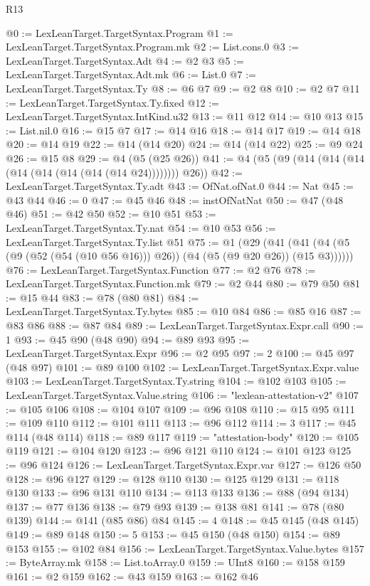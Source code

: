 \begin{lexlean}{R13}
\begin{coremodule}
{{{{{{{{{{{{{{{{{{{{{{{{{{{{{{{{{{{{{{{{{{{{{{{{{{{{{{{{{{{{{{{{{{{{{{{{{{{{{{{{{{{{{{{{{{{{{{{{{{{{{{{{{{@0 := LexLeanTarget.TargetSyntax.Program
@1 := LexLeanTarget.TargetSyntax.Program.mk
@2 := List.cons.{0}
@3 := LexLeanTarget.TargetSyntax.Adt
@4 := @2 @3
@5 := LexLeanTarget.TargetSyntax.Adt.mk
@6 := List.{0}
@7 := LexLeanTarget.TargetSyntax.Ty
@8 := @6 @7
@9 := @2 @8
@10 := @2 @7
@11 := LexLeanTarget.TargetSyntax.Ty.fixed
@12 := LexLeanTarget.TargetSyntax.IntKind.u32
@13 := @11 @12
@14 := @10 @13
@15 := List.nil.{0}
@16 := @15 @7
@17 := @14 @16
@18 := @14 @17
@19 := @14 @18
@20 := @14 @19
@22 := @14 (@14 @20)
@24 := @14 (@14 @22)
@25 := @9 @24
@26 := @15 @8
@29 := @4 (@5 (@25 @26))
@41 := @4 (@5 (@9 (@14 (@14 (@14 (@14 (@14 (@14 (@14 (@14 @24)))))))) @26))
@42 := LexLeanTarget.TargetSyntax.Ty.adt
@43 := OfNat.ofNat.{0}
@44 := Nat
@45 := @43 @44
@46 := 0
@47 := @45 @46
@48 := instOfNatNat
@50 := @47 (@48 @46)
@51 := @42 @50
@52 := @10 @51
@53 := LexLeanTarget.TargetSyntax.Ty.nat
@54 := @10 @53
@56 := LexLeanTarget.TargetSyntax.Ty.list @51
@75 := @1
    (@29 (@41 (@41 (@4 (@5 (@9 (@52 (@54 (@10 @56 @16))) @26)) (@4 (@5 (@9 @20 @26)) (@15 @3))))))
@76 := LexLeanTarget.TargetSyntax.Function
@77 := @2 @76
@78 := LexLeanTarget.TargetSyntax.Function.mk
@79 := @2 @44
@80 := @79 @50
@81 := @15 @44
@83 := @78 (@80 @81)
@84 := LexLeanTarget.TargetSyntax.Ty.bytes
@85 := @10 @84
@86 := @85 @16
@87 := @83 @86
@88 := @87 @84
@89 := LexLeanTarget.TargetSyntax.Expr.call
@90 := 1
@93 := @45 @90 (@48 @90)
@94 := @89 @93
@95 := LexLeanTarget.TargetSyntax.Expr
@96 := @2 @95
@97 := 2
@100 := @45 @97 (@48 @97)
@101 := @89 @100
@102 := LexLeanTarget.TargetSyntax.Expr.value
@103 := LexLeanTarget.TargetSyntax.Ty.string
@104 := @102 @103
@105 := LexLeanTarget.TargetSyntax.Value.string
@106 := "lexlean-attestation-v2"
@107 := @105 @106
@108 := @104 @107
@109 := @96 @108
@110 := @15 @95
@111 := @109 @110
@112 := @101 @111
@113 := @96 @112
@114 := 3
@117 := @45 @114 (@48 @114)
@118 := @89 @117
@119 := "attestation-body"
@120 := @105 @119
@121 := @104 @120
@123 := @96 @121 @110
@124 := @101 @123
@125 := @96 @124
@126 := LexLeanTarget.TargetSyntax.Expr.var
@127 := @126 @50
@128 := @96 @127
@129 := @128 @110
@130 := @125 @129
@131 := @118 @130
@133 := @96 @131 @110
@134 := @113 @133
@136 := @88 (@94 @134)
@137 := @77 @136
@138 := @79 @93
@139 := @138 @81
@141 := @78 (@80 @139)
@144 := @141 (@85 @86) @84
@145 := 4
@148 := @45 @145 (@48 @145)
@149 := @89 @148
@150 := 5
@153 := @45 @150 (@48 @150)
@154 := @89 @153
@155 := @102 @84
@156 := LexLeanTarget.TargetSyntax.Value.bytes
@157 := ByteArray.mk
@158 := List.toArray.{0}
@159 := UInt8
@160 := @158 @159
@161 := @2 @159
@162 := @43 @159
@163 := @162 @46
}}}}}}}}}}}}}}}}}}}}}}}}}}}}}}}}}}}}}}}}}}}}}}}}}}}}}}}}}}}}}}}}}}}}}}}}}}}}}}}}}}}}}}}}}}}}}}}}}}}}}}}}}}
\end{coremodule}
\end{lexlean}
